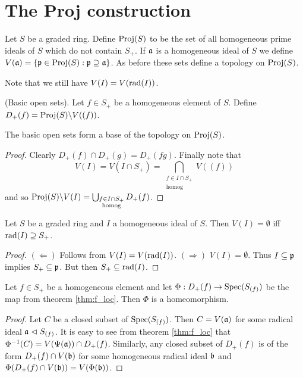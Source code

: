 \documentclass{memoir}
\begin{document}
\section{The Proj construction}
\begin{definition}
    Let $S$ be a graded ring.
    Define $\operatorname{Proj}(S)$ to be the set of all homogeneous prime ideals of $S$ which do not contain $S_+$.
    If $\mathfrak{a}$ is a homogeneous ideal of $S$ we define $V(\mathfrak{a}) = \lbrace\mathfrak{p}\in \operatorname{Proj}(S):\mathfrak{p}\supseteq \mathfrak{a}\rbrace$.
    As before these sets define a topology on $\operatorname{Proj}(S)$.
\end{definition}
\begin{remark}
    Note that we still have $V(I) = V(\text{rad}(I))$.
\end{remark}
\begin{definition}
    (Basic open sets).
    Let $f\in S_+$ be a homogeneous element of $S$.
    Define $D_+(f) = \operatorname{Proj}(S)\backslash V((f))$.
\end{definition}
\begin{proposition}
    The basic open sets form a base of the topology on $\operatorname{Proj}(S)$.
\end{proposition}
\begin{proof}
    Clearly $D_+(f)\cap D_+(g) = D_+(fg)$.
    Finally note that 
    \begin{equation}
        V(I) = V(I\cap S_+) = \bigcap_{\substack{f\in I\cap S_+ \\ \text{homog}}}V((f))
    \end{equation}
    and so $\operatorname{Proj}(S)\backslash V(I) = \bigcup_{\substack{f\in I\cap S_+ \\ \text{homog}}}D_+(f)$.
\end{proof}
\begin{proposition}
    Let $S$ be a graded ring and $I$ a homogeneous ideal of $S$.
    Then $V(I) = \emptyset$ iff $\text{rad}(I) \supseteq S_+$.
\end{proposition}
\begin{proof}
    $(\Leftarrow)$ Follows from $V(I) = V(\text{rad}(I))$.
    $(\Rightarrow)$ $V(I) = \emptyset$. Thus $I\subseteq \mathfrak{p}$ implies $S_+ \subseteq \mathfrak{p}$. 
    But then $S_+ \subseteq \text{rad}(I)$.
\end{proof}
\begin{lemma}
    Let $f\in S_+$ be a homogeneous element and let $\Phi:D_+(f)\to \operatorname{Spec}(S_{(f)})$ be the map from theorem \ref{thm:f_loc}.
    Then $\Phi$ is a homeomorphism.
\end{lemma}
\begin{proof}
    Let $C$ be a closed subset of $\operatorname{Spec}(S_{(f)})$. 
    Then $C = V(\mathfrak{a})$ for some radical ideal $\mathfrak{a}\vartriangleleft S_{(f)}$.
    It is easy to see from theorem \ref{thm:f_loc} that $\Phi^{-1}(C) = V(\Psi(\mathfrak{a}))\cap D_+(f)$.
    Similarly, any closed subset of $D_+(f)$ is of the form $D_+(f)\cap V(\mathfrak{b})$ for some homogeneous radical ideal $\mathfrak{b}$ and $\Phi(D_+(f)\cap V(\mathfrak{b})) = V(\Phi(\mathfrak{b}))$.
\end{proof}
\end{document}
